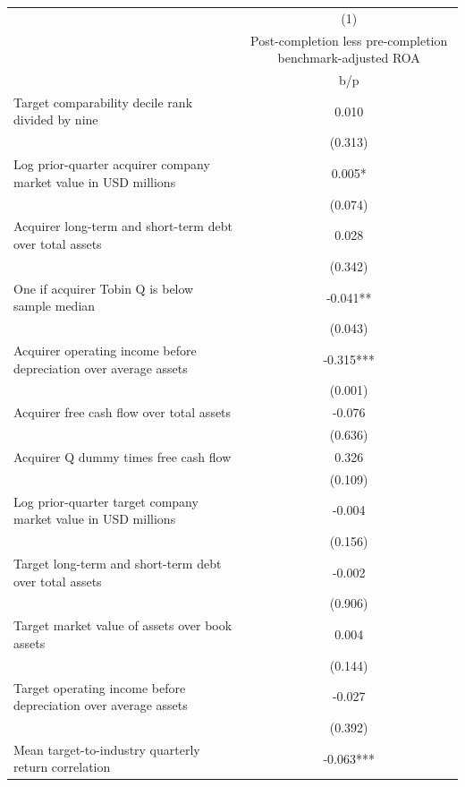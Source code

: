 {
\def\sym#1{\ifmmode^{#1}\else\(^{#1}\)\fi}
\begin{tabular}{l*{1}{c}}
\hline\hline
                    &\multicolumn{1}{c}{(1)}\\
                    &\multicolumn{1}{c}{Post-completion less pre-completion benchmark-adjusted ROA}\\
                    &         b/p   \\
\hline
Target comparability decile rank divided by nine&       0.010   \\
                    &     (0.313)   \\
Log prior-quarter acquirer company market value in USD millions&       0.005*  \\
                    &     (0.074)   \\
Acquirer long-term and short-term debt over total assets&       0.028   \\
                    &     (0.342)   \\
One if acquirer Tobin Q is below sample median&      -0.041** \\
                    &     (0.043)   \\
Acquirer operating income before depreciation over average assets&      -0.315***\\
                    &     (0.001)   \\
Acquirer free cash flow over total assets&      -0.076   \\
                    &     (0.636)   \\
Acquirer Q dummy times free cash flow&       0.326   \\
                    &     (0.109)   \\
Log prior-quarter target company market value in USD millions&      -0.004   \\
                    &     (0.156)   \\
Target long-term and short-term debt over total assets&      -0.002   \\
                    &     (0.906)   \\
Target market value of assets over book assets&       0.004   \\
                    &     (0.144)   \\
Target operating income before depreciation over average assets&      -0.027   \\
                    &     (0.392)   \\
Mean target-to-industry quarterly return correlation&      -0.063***\\

\end{tabular}}
